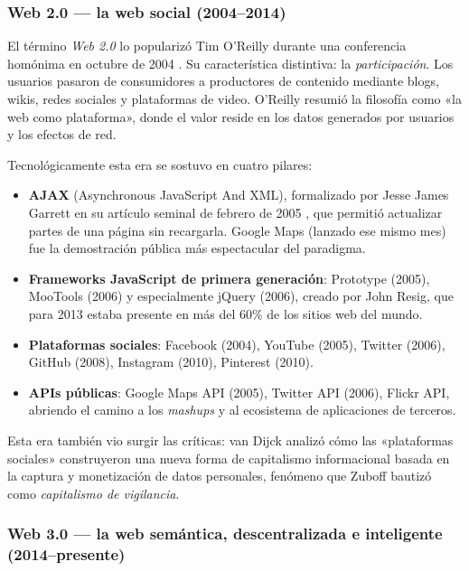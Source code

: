 \documentclass[11pt,a4paper,openany]{book}
\begin{document}
\subsubsection{Web 2.0 --- la web social (2004--2014)}

El término \emph{Web 2.0} lo popularizó Tim O'Reilly durante una
conferencia homónima en octubre de 2004 \cite{oreilly2005what}. Su
característica distintiva: la \emph{participación}. Los usuarios
pasaron de consumidores a productores de contenido mediante blogs,
wikis, redes sociales y plataformas de video. O'Reilly resumió la
filosofía como «la web como plataforma», donde el valor reside en los
datos generados por usuarios y los efectos de red.

Tecnológicamente esta era se sostuvo en cuatro pilares:

\begin{itemize}
\item \textbf{AJAX} (Asynchronous JavaScript And XML), formalizado por
Jesse James Garrett en su artículo seminal de febrero de 2005
\cite{garrett2005ajax}, que permitió actualizar partes de una página
sin recargarla. Google Maps (lanzado ese mismo mes) fue la
demostración pública más espectacular del paradigma.
\item \textbf{Frameworks JavaScript de primera generación}: Prototype
(2005), MooTools (2006) y especialmente jQuery (2006), creado por
John Resig, que para 2013 estaba presente en más del 60\% de los
sitios web del mundo.
\item \textbf{Plataformas sociales}: Facebook (2004), YouTube (2005),
Twitter (2006), GitHub (2008), Instagram (2010), Pinterest (2010).
\item \textbf{APIs públicas}: Google Maps API (2005), Twitter API
(2006), Flickr API, abriendo el camino a los \emph{mashups} y al
ecosistema de aplicaciones de terceros.
\end{itemize}

Esta era también vio surgir las críticas: van Dijck
\cite{vandijck2013culture} analizó cómo las «plataformas sociales»
construyeron una nueva forma de capitalismo informacional basada en
la captura y monetización de datos personales, fenómeno que Zuboff
\cite{zuboff2019capitalismo} bautizó como \emph{capitalismo de
vigilancia}.

\subsubsection{Web 3.0 --- la web semántica, descentralizada e inteligente (2014--presente)}
\end{document}
